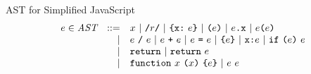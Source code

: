 \documentclass[9pt]{sigplanconf}
\begin{document}
\begin{displayfigure}{\label{fig:ast}AST for Simplified JavaScript}
\[
\begin{array}{rrl}
  e \in \textit{AST} &::=& x ~|~ \texttt{/}r\texttt{/} ~|~ 
  \texttt{\{} 
  \texttt{x}
  \texttt{:}
  ~e
  \texttt{\}}
  ~|~ \texttt{(} e \texttt{)}
  ~|~ e\texttt{.}\texttt{x} ~|~ e \texttt{(} e \texttt{)}
  \\
  &|& e~\texttt{/}~e ~|~ e ~\texttt{+}~ e ~|~ e ~\texttt{=}~ e
  ~|~ \texttt{\{} e \texttt{\}} ~|~ \texttt{x} \texttt{:} e ~|~ \texttt{if}~
  \texttt{(} e \texttt{)}~e
  \\ 
  &|& \texttt{return} ~|~ \texttt{return}~e
  \\
  &|& \texttt{function}~x~
  \texttt{(}x \texttt{)}~
  \texttt{\{} e \texttt{\}} ~|~ e~e
\end{array}
\]
\end{displayfigure}
\end{document}
